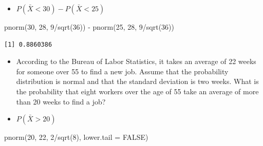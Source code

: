 \documentclass[
  letterpaper,
  DIV=11,
  numbers=noendperiod]{scrreprt}
\newenvironment{Shaded}{\begin{snugshade}}{\end{snugshade}}
\newcommand{\AttributeTok}[1]{\textcolor[rgb]{0.40,0.45,0.13}{#1}}
\newcommand{\ConstantTok}[1]{\textcolor[rgb]{0.56,0.35,0.01}{#1}}
\newcommand{\DecValTok}[1]{\textcolor[rgb]{0.68,0.00,0.00}{#1}}
\newcommand{\FunctionTok}[1]{\textcolor[rgb]{0.28,0.35,0.67}{#1}}
\newcommand{\NormalTok}[1]{\textcolor[rgb]{0.00,0.23,0.31}{#1}}
\newcommand{\SpecialCharTok}[1]{\textcolor[rgb]{0.37,0.37,0.37}{#1}}
\providecommand{\tightlist}{%
  \setlength{\itemsep}{0pt}\setlength{\parskip}{0pt}}\usepackage{longtable,booktabs,array}
\begin{document}
\begin{itemize}
\begin{verbatim}
[1] 0.2503353
\end{verbatim}

  \begin{itemize}
  \tightlist
  \item
    Over the entire six years that students attend an Ohio elementary
    school, they are absent, on average, 28 days due to influenza.
    Assume that the standard deviation over this time period is
    \(\sigma\) = 9 days. Upon graduation from elementary school, a
    random sample of 36 students is taken and asked how many days of
    school they missed due to influenza. What is the probability that
    the sample mean is between 25 and 30 school days?
  \end{itemize}
\item
  \(P(\bar{X} < 30)-P(\bar{X} < 25)\)
\end{itemize}

\begin{Shaded}
\begin{Highlighting}[]
\FunctionTok{pnorm}\NormalTok{(}\DecValTok{30}\NormalTok{, }\DecValTok{28}\NormalTok{, }\DecValTok{9}\SpecialCharTok{/}\FunctionTok{sqrt}\NormalTok{(}\DecValTok{36}\NormalTok{)) }\SpecialCharTok{{-}} \FunctionTok{pnorm}\NormalTok{(}\DecValTok{25}\NormalTok{, }\DecValTok{28}\NormalTok{, }\DecValTok{9}\SpecialCharTok{/}\FunctionTok{sqrt}\NormalTok{(}\DecValTok{36}\NormalTok{))}
\end{Highlighting}
\end{Shaded}

\begin{verbatim}
[1] 0.8860386
\end{verbatim}

\begin{itemize}
\tightlist
\item
  According to the Bureau of Labor Statistics, it takes an average of 22
  weeks for someone over 55 to find a new job. Assume that the
  probability distribution is normal and that the standard deviation is
  two weeks. What is the probability that eight workers over the age of
  55 take an average of more than 20 weeks to find a job?
\item
  \(P(\bar{X} >20)\)
\end{itemize}

\begin{Shaded}
\begin{Highlighting}[]
\FunctionTok{pnorm}\NormalTok{(}\DecValTok{20}\NormalTok{, }\DecValTok{22}\NormalTok{, }\DecValTok{2}\SpecialCharTok{/}\FunctionTok{sqrt}\NormalTok{(}\DecValTok{8}\NormalTok{), }\AttributeTok{lower.tail =} \ConstantTok{FALSE}\NormalTok{)}
\end{Highlighting}
\end{Shaded}
\end{document}
